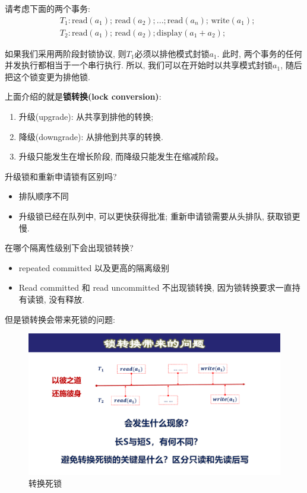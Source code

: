 请考虑下面的两个事务:
\begin{align*}
    &T_1: \text{read}(a_1);\,\text{read}(a_2);...;\text{read}(a_n);\,\text{write}(a_1); \\
    &T_2: \text{read}(a_1);\,\text{read}(a_2);\text{display}(a_1+a_2);
\end{align*}

如果我们采用两阶段封锁协议, 则$T_1$必须以排他模式封锁$a_1$. 此时, 两个事务的任何并发执行都相当于一个串行执行. 所以, 我们可以在开始时以共享模式封锁$a_1$, 随后把这个锁变更为排他锁.

上面介绍的就是\textbf{锁转换(lock conversion)}:
\begin{enumerate}
    \item 升级(upgrade): 从共享到排他的转换;
    \item 降级(downgrade): 从排他到共享的转换.
    \item 升级只能发生在增长阶段, 而降级只能发生在缩减阶段。
\end{enumerate}

\begin{problem}
  升级锁和重新申请锁有区别吗?
\end{problem}

\begin{itemize}
  \item 排队顺序不同
  \item 升级锁已经在队列中, 可以更快获得批准; 重新申请锁需要从头排队, 获取锁更慢.
\end{itemize}

\begin{problem}
  在哪个隔离性级别下会出现锁转换?
\end{problem}
\begin{itemize}
  \item repeated committed 以及更高的隔离级别
  \item Read committed 和 read uncommitted 不出现锁转换, 因为锁转换要求一直持有读锁, 没有释放.
\end{itemize}

但是锁转换会带来死锁的问题: 
\begin{figure}[H]
    \centering
    \includegraphics[width=.6\textwidth]{figure/并发控制-锁转换.pdf}
    \caption{转换死锁}
\end{figure}

